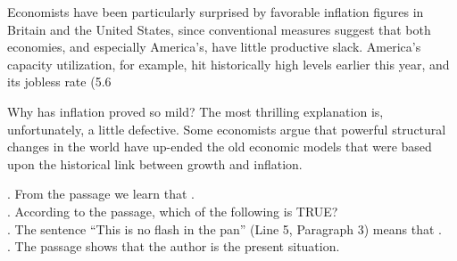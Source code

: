 Economists have been particularly surprised by favorable inflation figures in Britain and the United States, since conventional measures suggest that both economies, and especially America’s, have little productive slack. America’s capacity utilization, for example, hit historically high levels earlier this year, and its jobless rate (5.6%

Why has inflation proved so mild? The most thrilling explanation is, unfortunately, a little defective. Some economists argue that powerful structural changes in the world have up-ended the old economic models that were based upon the historical link between growth and inflation.
\begin{questions}    .	From the passage we learn that \ltk{}.\\
    .	According to the passage, which of the following is TRUE?\\
    .	The sentence “This is no flash in the pan” (Line 5, Paragraph 3) means that \ltk{}.\\
    .	The passage shows that the author is \ltk{} the present situation.\\
\end{questions}

